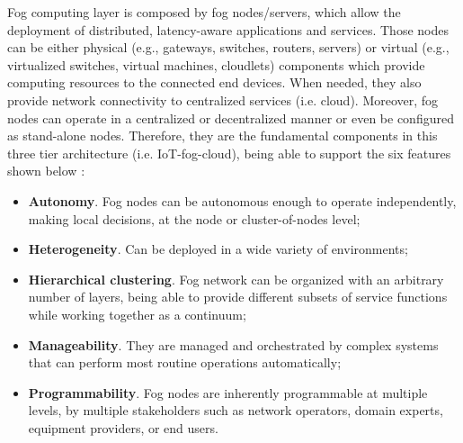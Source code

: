\noindent\tab Fog computing layer is composed by fog nodes/servers, which allow the deployment of distributed, latency-aware applications and services. Those nodes can be either physical (e.g., gateways, switches, routers, servers) or virtual (e.g., virtualized switches, virtual machines, cloudlets) components which provide computing resources to the connected end devices. When needed, they also provide network connectivity to centralized services (i.e. cloud). Moreover, fog nodes can operate in a centralized or decentralized manner or even be configured as stand-alone nodes. Therefore, they are the fundamental components in this three tier architecture (i.e. IoT-fog-cloud), being able to support the six features shown below \cite{iorga2018fog}:
\begin{itemize}
	\item \textbf{Autonomy}. Fog nodes can be autonomous enough to operate independently, making local decisions, at the node or cluster-of-nodes level;
	\item \textbf{Heterogeneity}. Can be deployed in a wide variety of environments;
	\item \textbf{Hierarchical clustering}. Fog network can be organized with an arbitrary number of layers, being able to provide different subsets of service functions while working together as a continuum;
	\item \textbf{Manageability}. They are managed and orchestrated by complex systems that can perform most routine operations automatically;
	\item \textbf{Programmability}. Fog nodes are inherently programmable at multiple levels, by multiple stakeholders such as network operators, domain experts, equipment providers, or end users.
\end{itemize}

